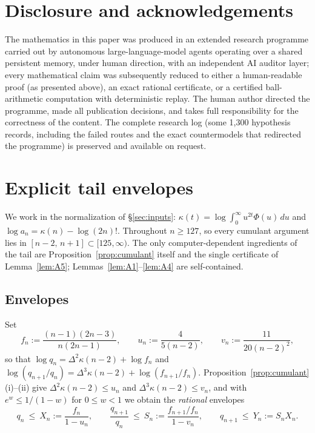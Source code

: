 \documentclass[11pt]{amsart}
\theoremstyle{definition}
\theoremstyle{remark}
\begin{document}
\section{Disclosure and acknowledgements}\label{sec:disclosure}

The mathematics in this paper was produced in an extended research
programme carried out by autonomous large-language-model agents
operating over a shared persistent memory, under human direction, with
an independent AI auditor layer; every mathematical claim was
subsequently reduced to either a human-readable proof (as presented
above), an exact rational certificate, or a certified ball-arithmetic
computation with deterministic replay. The human author directed the
programme, made all publication decisions, and takes full
responsibility for the correctness of the content. The complete
research log (some 1,300 hypothesis records, including the failed
routes and the exact countermodels that redirected the programme) is
preserved and available on request.

\appendix

\section{Explicit tail envelopes}\label{app:envelopes}

We work in the normalization of \S\ref{sec:inputs}:
$\kappa(t)=\log\int_0^\infty u^{2t}\Phi(u)\,du$ and
$\log a_n=\kappa(n)-\log(2n)!$. Throughout $n\ge 127$, so every
cumulant argument lies in $[n-2,\,n+1]\subset[125,\infty)$. The only
computer-dependent ingredients of the tail are
Proposition~\ref{prop:cumulant} itself and the single certificate of
Lemma~\ref{lem:A5}; Lemmas~\ref{lem:A1}--\ref{lem:A4} are
self-contained.

\subsection*{Envelopes}
Set
\[
f_n:=\frac{(n-1)(2n-3)}{n(2n-1)},\qquad
u_n:=\frac{4}{5(n-2)},\qquad
v_n:=\frac{11}{20(n-2)^{2}},
\]
so that $\log q_n=\Delta^{2}\kappa(n-2)+\log f_n$ and
$\log(q_{n+1}/q_n)=\Delta^{3}\kappa(n-2)+\log(f_{n+1}/f_n)$.
Proposition~\ref{prop:cumulant}(i)--(ii) give
$\Delta^{2}\kappa(n-2)\le u_n$ and $\Delta^{3}\kappa(n-2)\le v_n$, and
with $e^{w}\le 1/(1-w)$ for $0\le w<1$ we obtain the \emph{rational}
envelopes
\[
q_n\ \le\ X_n:=\frac{f_n}{1-u_n},
\qquad
\frac{q_{n+1}}{q_n}\ \le\ S_n:=\frac{f_{n+1}/f_n}{1-v_n},
\qquad
q_{n+1}\ \le\ Y_n:=S_nX_n .
\]
\end{document}
